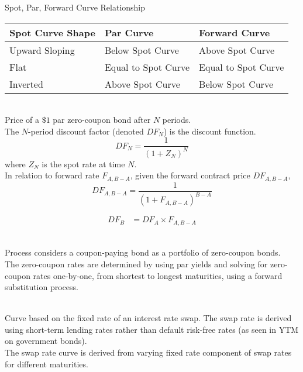 \begin{flushleft}
Spot, Par, Forward Curve Relationship
\begin{tabularx}{\textwidth}{X|X|X}
\hline
\rowcolor{gray!30}
Spot Curve Shape & Par Curve & Forward Curve \\
\hline
Upward Sloping & Below Spot Curve & Above Spot Curve \\
\hline
Flat & Equal to Spot Curve & Equal to Spot Curve \\
\hline
Inverted & Above Spot Curve & Below Spot Curve \\
\hline
\end{tabularx}
\end{flushleft}

\begin{definition} \\
Price of a $\$1$ par zero-coupon bond after $N$ periods.\\
The $N$-period discount factor (denoted $DF_N$) is the discount function.
\begin{equation}
DF_N = \frac{1}{(1+Z_N)^N} \nonumber
\end{equation}
where $Z_N$ is the spot rate at time $N$.\\
In relation to forward rate $F_{A, B-A}$, given the forward contract price $DF_{A, B-A}$,
\begin{equation}
DF_{A, B-A} = \frac{1}{\left(1 + F_{A, B-A} \right)^{B-A}} \nonumber
\end{equation}
\end{definition}

\begin{definition} 
\begin{align}
DF_B &= DF_A \times F_{A, B-A} \nonumber
\end{align}
\end{definition}

\begin{method} \\
Process considers a coupon-paying bond as a portfolio of zero-coupon bonds.\\
The zero-coupon rates are determined by using  par yields and solving for zero-coupon rates one-by-one, from shortest to longest maturities, using a forward substitution process.
\end{method}

\begin{definition} \\
Curve based on the fixed rate of an interest rate swap. The swap rate is derived using short-term lending rates rather than default risk-free rates (as seen in YTM on government bonds).\\
The swap rate curve is derived from varying fixed rate component of swap rates for different maturities.
\end{definition}

